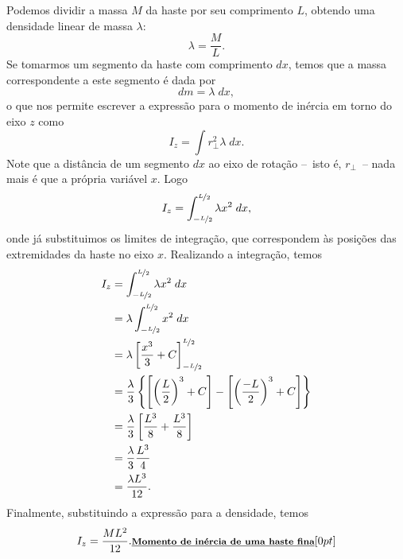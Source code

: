 Podemos dividir a massa $M$ da haste por seu comprimento $L$, obtendo uma densidade linear de massa $\lambda$:
\begin{equation}
    \lambda = \frac{M}{L}.
\end{equation}
%
Se tomarmos um segmento da haste com comprimento $dx$, temos que a massa correspondente a este segmento é dada por
\begin{equation}
    dm = \lambda \; dx,
\end{equation}
%
o que nos permite escrever a expressão para o momento de inércia em torno do eixo $z$ como
\begin{equation}
    I_z = \int r_\perp^2 \lambda \;dx.
\end{equation}
%
Note que a distância de um segmento $dx$ ao eixo de rotação --~isto é, $r_\perp$~-- nada mais é que a própria variável $x$. Logo
\begin{equation}
    I_z = \int_{-\nicefrac{L}{2}}^{\nicefrac{L}{2}} \lambda x^2 \; dx,
\end{equation}
%
onde já substituimos os limites de integração, que correspondem às posições das extremidades da haste no eixo $x$. Realizando a integração, temos
\begin{align}
    I_z &= \int_{-\nicefrac{L}{2}}^{\nicefrac{L}{2}} \lambda x^2 \; dx \label{Eq:MomInerciaHasteFinaInteg}\\
    &= \lambda \int_{-\nicefrac{L}{2}}^{\nicefrac{L}{2}} x^2 \; dx \\
    &= \lambda \left[\frac{x^3}{3} + C\right]_{-\nicefrac{L}{2}}^{\nicefrac{L}{2}} \\
    &= \frac{\lambda}{3} \left\{\left[\left(\frac{L}{2}\right)^3 + C\right] - \left[\left(\frac{-L}{2}\right)^3 + C\right] \right\} \\
    &= \frac{\lambda}{3} \left[\frac{L^3}{8} + \frac{L^3}{8}\right] \\
    &= \frac{\lambda}{3}\frac{L^3}{4} \\
    &= \frac{\lambda L^3}{12}.
\end{align}
%
Finalmente, substituindo a expressão para a densidade, temos
\begin{equation}
    I_z = \frac{ML^2}{12}. \relax{\footnotesize\emph{\textbf{Momento de inércia de uma haste fina}}}[0pt]
\end{equation}

